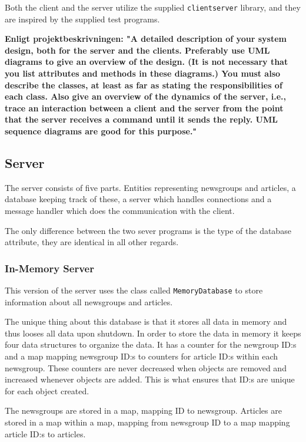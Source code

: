 \documentclass[a4paper]{article}
\begin{document}
Both the client and the server utilize the supplied \texttt{clientserver} library, and they are inspired by the supplied test programs.

\textbf{Enligt projektbeskrivningen: "A detailed description of your system design, both for the server and the clients. Preferably
use UML diagrams to give an overview of the design. (It is not necessary that you list
attributes and methods in these diagrams.) You must also describe the classes, at least as
far as stating the responsibilities of each class. Also give an overview of the dynamics of the server, i.e., trace an interaction between a
client and the server from the point that the server receives a command until it sends the
reply. UML sequence diagrams are good for this purpose."}

\subsection{Server}

The server consists of five parts. Entities representing newsgroups and articles, a database keeping track of these, a server which handles connections and a message handler which does the communication with the client.

The only difference between the two sever programs is the type of the database attribute, they are identical in all other regards.

\subsubsection{In-Memory Server}

This version of the server uses the class called \texttt{MemoryDatabase} to store information about all newsgroups and articles.

The unique thing about this database is that it stores all data in memory and thus looses all data upon shutdown. In order to store the data in memory it keeps four data structures to organize the data. It has a counter for the newgroup ID:s and a map mapping newsgroup ID:s to counters for article ID:s within each newsgroup. These counters are never decreased when objects are removed and increased whenever objects are added. This is what ensures that ID:s are unique for each object created.

The newsgroups are stored in a map, mapping ID to newsgroup. Articles are stored in a map within a map, mapping from newsgroup ID to a map mapping article ID:s to articles.
\end{document}
